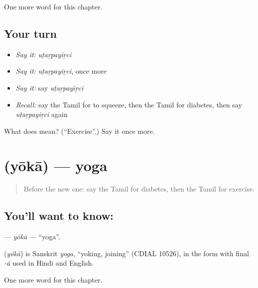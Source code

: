 \begin{grammarlens}[title={What you've built}]
One more word for this chapter.
\end{grammarlens}

\subsection*{Your turn}
\begin{itemize}
\raggedright
  \item \emph{Say it:} \emph{uṭaṟpayiṟci}
  \item \emph{Say it:} \emph{uṭaṟpayiṟci}, once more
  \item \emph{Say it:} say \emph{uṭaṟpayiṟci}
  \item \emph{Recall:} say the Tamil for to squeeze, then the Tamil for diabetes, then say \emph{uṭaṟpayiṟci} again
\end{itemize}

\begin{tcolorbox}[breakable,colback=teal!4,colframe=teal!35!black,title={Before you move on}]
What does  mean? (\textquotedblleft{}Exercise\textquotedblright{}.) Say it once more.
\end{tcolorbox}
\section[\texorpdfstring{\ta{யோகா} (yōkā)}{யோகா (yōkā)}]{ (yōkā) — yoga}

\label{lesson:TA-C261-yoka}



\begin{quote}
Before the new one: say the Tamil for diabetes, then the Tamil for exercise.
\end{quote}

\subsection*{You'll want to know: }
\textbf{} — \emph{yōkā} — \textquotedblleft{}yoga\textquotedblright{}.

\begin{cousinweb}
\textbf{} (\emph{yōkā}) is Sanskrit \emph{yoga}, \textquotedblleft{}yoking, joining\textquotedblright{} (CDIAL 10526), in the form with final \emph{-ā} used in Hindi and English.
\end{cousinweb}

\begin{grammarlens}[title={What you've built}]
One more word for this chapter.
\end{grammarlens}

